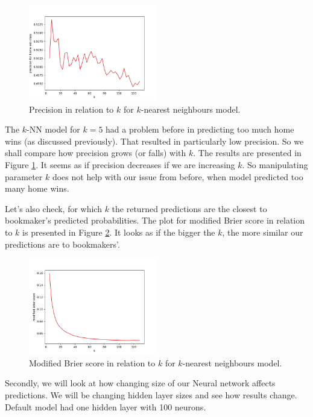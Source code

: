 \documentclass[conference]{IEEEtran}
\begin{document}
\begin{figure}[!ht]
\includegraphics[width=0.5\textwidth]{precision_k_knn.png}
\caption{Precision in relation to $k$ for $k$-nearest neighbours model.}
\label{prec-knn}
\end{figure}

The $k$-NN model for $k=5$ had a problem before in predicting too much home wins (as discussed 
previously). That resulted in particularly low precision. So we shall compare how precision
grows (or falls) with $k$. The results are presented in Figure \ref{prec-knn}. It seems as if
precision decreases if we are increasing $k$. So manipulating parameter $k$ does not help with
our issue from before, when model predicted too many home wins.

Let's also check, for which $k$ the returned predictions are the closest to bookmaker's 
predicted probabilities. The plot for modified Brier score in relation to $k$ is presented in Figure \ref{mbs-knn}. It looks as if the bigger the $k$, the more similar our predictions are to bookmakers'.

\begin{figure}[!ht]
\includegraphics[width=0.5\textwidth]{mbs_k_knn.png}
\caption{Modified Brier score in relation to $k$ for $k$-nearest neighbours model.}
\label{mbs-knn}
\end{figure}

Secondly, we will look at how changing size of our Neural network affects predictions.
We will be changing hidden layer sizes and see how results change. Default model had one
hidden layer with 100 neurons.
\end{document}
